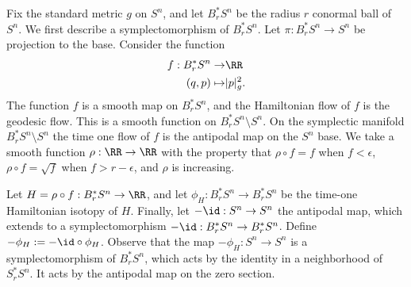 

    Fix the standard metric $g$ on $S^n$, and let $B_r^*S^{n}$ be the radius  $r$ conormal ball of $S^n$. 
    We first describe a symplectomorphism of $B_r^*S^n$. Let $\pi: B^*_rS^n\to S^n$ be projection to the base.
    Consider the function 
    \begin{align*}
        f: B_r^*S^{n}\to& \RR\\
        (q, p) \mapsto& |p|_g^2.
    \end{align*}
    The function $f$ is a smooth map on $B_r^*S^n$, and the Hamiltonian flow of $f$ is the geodesic flow. 
    This is a smooth function on $B^*_rS^n\setminus S^n$. 
    On the symplectic manifold $B^*_rS^n\setminus S^n$ the time one flow of $f$ is the antipodal map on the $S^n$ base. 
    We take a smooth function $\rho: \RR\to \RR$ with the property that $\rho \circ f = f$ when $f< \epsilon$, $\rho\circ f=\sqrt f$ when $f>r-\epsilon$, and $\rho$ is increasing. 

    
    
    Let $H= \rho \circ f: B^*_rS^n\to \RR$, and let $\phi_H: B_r^*S^n\to B_r^*S^n$ be the time-one Hamiltonian isotopy of $H$. 
    Finally, let $-\id: S^n\to S^n$ the antipodal map, which extends to a symplectomorphism $-\id: B_r^*S^n\to B_r^*S^n$. 
    Define $-\phi_H:=-\id\circ \phi_H$. 
    Observe that the map $-\phi_H: S^n\to S^n$ is a symplectomorphism of $B_r^*{S^n}$, which acts by the identity in a neighborhood of $S_r^*S^{n}$.
    It acts by the antipodal map on the zero section.
